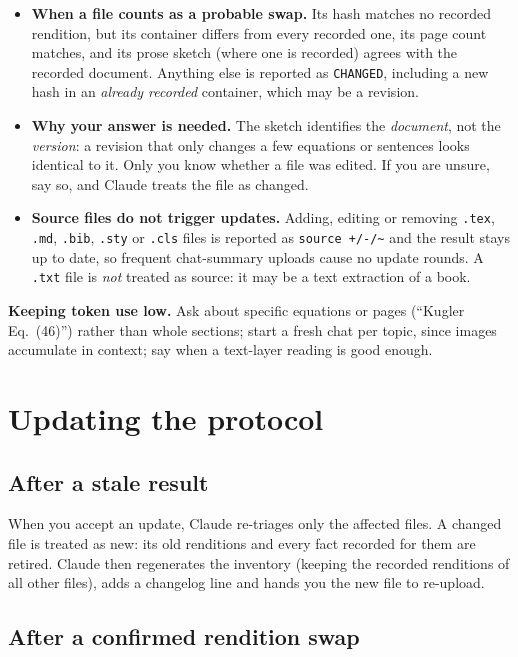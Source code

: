 \documentclass[11pt,a4paper]{article}
\newcommand{\file}[1]{\texttt{#1}}
\begin{document}
\begin{itemize}
  \item \textbf{When a file counts as a probable swap.} Its hash matches no
  recorded rendition, but its container differs from every recorded one,
  its page count matches, and its prose sketch (where one is recorded)
  agrees with the recorded document. Anything else is reported as
  \texttt{CHANGED}, including a new hash in an \emph{already recorded}
  container, which may be a revision.
  \item \textbf{Why your answer is needed.} The sketch identifies the
  \emph{document}, not the \emph{version}: a revision that only changes a
  few equations or sentences looks identical to it. Only you know whether a
  file was edited. If you are unsure, say so, and Claude treats the file as
  changed.
  \item \textbf{Source files do not trigger updates.} Adding, editing or
  removing \file{.tex}, \file{.md}, \file{.bib}, \file{.sty} or \file{.cls}
  files is reported as \texttt{source +/-/\textasciitilde} and the result
  stays up to date, so frequent chat-summary uploads cause no update rounds.
  A \file{.txt} file is \emph{not} treated as source: it may be a text
  extraction of a book.
\end{itemize}

\textbf{Keeping token use low.} Ask about specific equations or pages
(``Kugler Eq.~(46)'') rather than whole sections; start a fresh chat per
topic, since images accumulate in context; say when a text-layer reading is
good enough.

\section{Updating the protocol}

\subsection{After a stale result}

When you accept an update, Claude re-triages only the affected files. A
changed file is treated as new: its old renditions and every fact recorded
for them are retired. Claude then regenerates the inventory (keeping the
recorded renditions of all other files), adds a changelog line and hands
you the new file to re-upload.

\subsection{After a confirmed rendition swap}\label{sec:swap}
\end{document}
